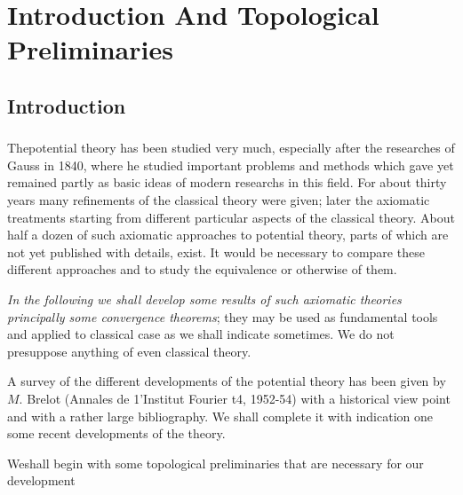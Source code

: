 \part{Introduction And Topological Preliminaries}\label{p1}

\chapter*{Introduction}\label{p1:chap1}

\section{}\label{p1:chap1:sec1}

The\pageoriginale potential theory has been studied very much,
especially after the 
researches of Gauss in 1840, where he studied important problems and
methods which gave yet remained partly as basic ideas of modern
researchs in this field. For about thirty years many refinements of
the classical theory were given; later the axiomatic treatments
starting from different particular aspects of the classical
theory. About half a dozen of such axiomatic approaches to potential
theory, parts of which are not yet published with details, exist. It
would be necessary to compare these different approaches and to study
the equivalence or  otherwise of them. 

\textit{In the following we shall develop some results of such
  axiomatic theories principally some convergence theorems}; they may
be used as fundamental tools and applied to classical case as we shall
indicate sometimes. We do not presuppose anything of even classical
theory. 

A survey of the different developments of the potential theory has
been given by $M$. Brelot (Annales de 1'Institut Fourier t4, 1952-54)
with a historical view point and with a rather large bibliography. We
shall complete it with indication one some recent developments of the
theory. 

We\pageoriginale shall begin with some topological preliminaries that
are necessary for our development  


\section{}\label{p1:chap2:sec1}

